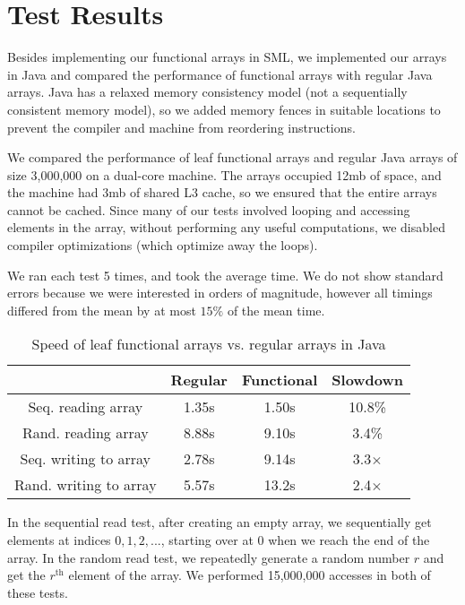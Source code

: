 \section{Test Results}
\label{sec:experiments}

Besides implementing our functional arrays in SML, we implemented our arrays in Java and compared the performance of functional arrays with regular Java arrays. Java has a relaxed memory consistency model (not a sequentially consistent memory model), so we added memory fences in suitable locations to prevent the compiler and machine from reordering instructions.

We compared the performance of leaf functional arrays and regular Java arrays of size 3,000,000 on a dual-core machine. The arrays occupied 12mb of space, and the machine had 3mb of shared L3 cache, so we ensured that the entire arrays cannot be cached. Since many of our tests involved looping and accessing elements in the array, without performing any useful computations, we disabled compiler optimizations (which optimize away the loops).

We ran each test 5 times, and took the average time. We do not show standard errors because we were interested in orders of magnitude, however all timings differed from the mean by at most $15\%$ of the mean time.

\begin{table}[h!]
\centering
\begin{tabular}{ |c|c|c|c| } 
 \hline
  & Regular & Functional & Slowdown \\ 
 \hline
 Seq. reading array & 1.35s & 1.50s & 10.8\% \\ 
 \hline
 Rand. reading array & 8.88s & 9.10s & 3.4\% \\ 
 \hline
 Seq. writing to array & 2.78s & 9.14s & 3.3$\times$ \\ 
 \hline
 Rand. writing to array & 5.57s & 13.2s & 2.4$\times$ \\ 
 \hline
\end{tabular}
\caption{Speed of leaf functional arrays vs. regular arrays in Java}
\label{mytable}
\end{table}

In the sequential read test, after creating an empty array, we sequentially get elements at indices $0,1,2,...$, starting over at $0$ when we reach the end of the array. In the random read test, we repeatedly generate a random number $r$ and get the $r^{\text{th}}$ element of the array. We performed 15,000,000 accesses in both of these tests.

